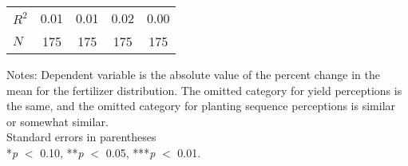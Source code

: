 \begin{table}[htbp]
\begin{threeparttable}
\begin{tabular}{l cccc}
\hline
$R^2$               &        0.01   &        0.01   &        0.02   &        0.00   \\
$N$                 &         175   &         175   &         175   &         175   \\
\hline
\hline
\end{tabular}
\begin{tablenotes}
\footnotesize
\item{Notes: Dependent variable is the absolute value of the percent change in the mean for the fertilizer distribution. The omitted category for yield perceptions is the same, and the omitted category for planting sequence perceptions is similar or somewhat similar. \\ Standard errors in parentheses \\ *\textit{p} $<$ 0.10, **\textit{p} $<$ 0.05, ***\textit{p} $<$ 0.01.}
\end{tablenotes}
\end{threeparttable}
\end{table}
